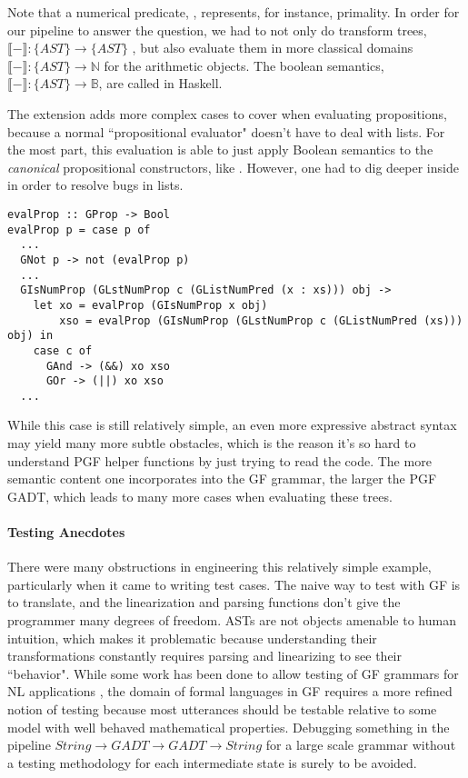 Note that a numerical predicate, , represents, for instance,
primality. In order for our pipeline to answer the question, we had to not only
do transform trees, $\llbracket - \rrbracket : \{AST\} \rightarrow
\{AST\}$ , but also evaluate them in more classical domains $\llbracket -
\rrbracket : \{AST\} \rightarrow \mathds{N}$ for the arithmetic objects. The
boolean semantics, 
$\llbracket - \rrbracket : \{AST\} \rightarrow \mathds{B}$,
are called  in Haskell.

The extension adds more complex cases to cover when evaluating propositions,
because a normal ``propositional evaluator" doesn't have to deal with lists. For
the most part, this evaluation is able to just apply Boolean semantics to the
\emph{canonical} propositional constructors, like . 
However, one had to dig deeper inside  in order to resolve
bugs in lists.

\begin{verbatim}
evalProp :: GProp -> Bool
evalProp p = case p of
  ...
  GNot p -> not (evalProp p)
  ...
  GIsNumProp (GLstNumProp c (GListNumPred (x : xs))) obj ->
    let xo = evalProp (GIsNumProp x obj)
        xso = evalProp (GIsNumProp (GLstNumProp c (GListNumPred (xs))) obj) in
    case c of
      GAnd -> (&&) xo xso
      GOr -> (||) xo xso
  ...
\end{verbatim}
While this case is still relatively simple, an even more expressive abstract syntax
may yield many more subtle obstacles, which is the reason it's so hard
to understand PGF helper functions by just trying to read the code. The more semantic content one
incorporates into the GF grammar, the larger the PGF GADT, which leads to many
more cases when evaluating these trees.

\paragraph{Testing Anecdotes}

There were many obstructions in engineering this relatively simple example,
particularly when it came to writing test cases. The naive way to test with GF
is to translate, and the linearization and parsing functions don't give the
programmer many degrees of freedom. ASTs are not objects amenable to human
intuition, which makes it problematic because understanding their
transformations constantly requires parsing and linearizing to see their
``behavior". While some work has been done to allow testing of GF grammars for
NL applications \cite{listenmaa2019phd}, the domain of formal languages in GF
requires a more refined notion of testing because most utterances should be
testable relative to some model with well behaved mathematical properties.
Debugging something in the pipeline $String \rightarrow GADT \rightarrow GADT
\rightarrow String$ for a large scale grammar without a testing methodology for
each intermediate state is surely to be avoided.

